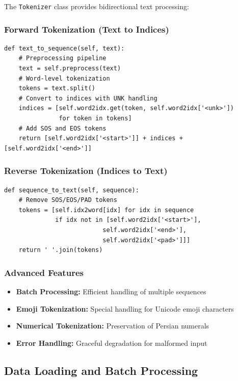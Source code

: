 \documentclass[conference]{IEEEtran}
\begin{document}
The \texttt{Tokenizer} class provides bidirectional text processing:

\subsubsection{Forward Tokenization (Text to Indices)}
\begin{lstlisting}
def text_to_sequence(self, text):
    # Preprocessing pipeline
    text = self.preprocess(text)
    # Word-level tokenization
    tokens = text.split()
    # Convert to indices with UNK handling
    indices = [self.word2idx.get(token, self.word2idx['<unk>'])
               for token in tokens]
    # Add SOS and EOS tokens
    return [self.word2idx['<start>']] + indices + [self.word2idx['<end>']]
\end{lstlisting}

\subsubsection{Reverse Tokenization (Indices to Text)}
\begin{lstlisting}
def sequence_to_text(self, sequence):
    # Remove SOS/EOS/PAD tokens
    tokens = [self.idx2word[idx] for idx in sequence
              if idx not in [self.word2idx['<start>'],
                           self.word2idx['<end>'],
                           self.word2idx['<pad>']]]
    return ' '.join(tokens)
\end{lstlisting}

\subsubsection{Advanced Features}
\begin{itemize}
  \item \textbf{Batch Processing:} Efficient handling of multiple sequences
  \item \textbf{Emoji Tokenization:} Special handling for Unicode emoji characters
  \item \textbf{Numerical Tokenization:} Preservation of Persian numerals
  \item \textbf{Error Handling:} Graceful degradation for malformed input
\end{itemize}

\subsection{Data Loading and Batch Processing}
\label{sec:q1_dataloader}
\end{document}
